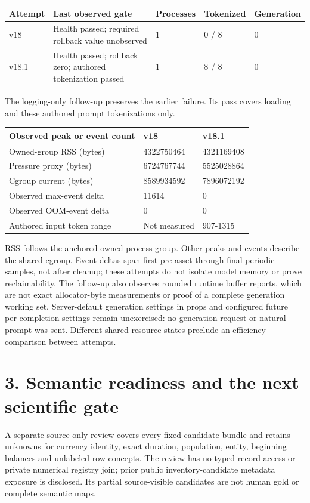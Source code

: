 \documentclass[10pt,a4paper]{article}
\begin{document}
\begin{longtable}{@{}p{}p{}p{}p{}p{}@{}}\toprule
\textbf{Attempt} & \textbf{Last observed gate} & \textbf{Processes} & \textbf{Tokenized} & \textbf{Generation} \\ \midrule\endhead
v18 & Health passed; required rollback value unobserved & 1 & 0 / 8 & 0 \\
v18.1 & Health passed; rollback zero; authored tokenization passed & 1 & 8 / 8 & 0 \\
\bottomrule\end{longtable}
{\small The logging-only follow-up preserves the earlier failure. Its pass covers loading and these authored prompt tokenizations only.}
\begin{longtable}{@{}p{}p{}p{}@{}}\toprule
\textbf{Observed peak or event count} & \textbf{v18} & \textbf{v18.1} \\ \midrule\endhead
Owned-group RSS (bytes) & 4322750464 & 4321169408 \\
Pressure proxy (bytes) & 6724767744 & 5525028864 \\
Cgroup current (bytes) & 8589934592 & 7896072192 \\
Observed max-event delta & 11614 & 0 \\
Observed OOM-event delta & 0 & 0 \\
Authored input token range & Not measured & 907-1315 \\
\bottomrule\end{longtable}
{\small RSS follows the anchored owned process group. Other peaks and events describe the shared cgroup. Event deltas span first pre-asset through final periodic samples, not after cleanup; these attempts do not isolate model memory or prove reclaimability.}
The follow-up also observes rounded runtime buffer reports, which are not exact allocator-byte measurements or proof of a complete generation working set. Server-default generation settings in props and configured future per-completion settings remain unexercised: no generation request or natural prompt was sent. Different shared resource states preclude an efficiency comparison between attempts.

\clearpage
\section*{3. Semantic readiness and the next scientific gate}
A separate source-only review covers every fixed candidate bundle and retains unknowns for currency identity, exact duration, population, entity, beginning balances and unlabeled row concepts. The review has no typed-record access or private numerical registry join; prior public inventory-candidate metadata exposure is disclosed. Its partial source-visible candidates are not human gold or complete semantic maps.
\end{document}
